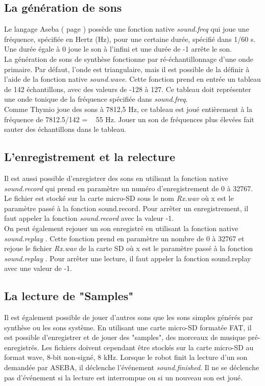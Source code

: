 \documentclass[a4paper, 12pt]{report}
\begin{document}
\subsection{La génération de sons}
Le langage Aseba ( page \pageref{aseba} ) possède une fonction native \textit{sound.freq} qui joue une fréquence, spécifiée en Hertz (Hz), pour une certaine durée, spécifié dans 1/60 s. Une durée égale à 0 joue le son à l'infini et une durée de -1 arrête le son.\\
La génération de sons de synthèse fonctionne par ré-échantillonnage d'une onde primaire. Par défaut, l'onde est triangulaire, mais il est possible de la	définir à l'aide de la fonction native \textit{sound.wave}. Cette fonction prend en entrée un tableau de 142 échantillons, avec des valeurs de -128 à 127. Ce tableau doit représenter une onde tonique de la fréquence spécifiée dans \textit{sound.freq}.\\
 Comme Thymio joue des sons à 7812,5 Hz, ce tableau est joué entièrement à la fréquence de 7812.5/142 = ~ 55 Hz. Jouer un son de fréquences plus élevées fait sauter des échantillons dans le tableau.

\subsection{L'enregistrement et la relecture}
Il est aussi possible d'enregistrer des sons en utilisant la fonction native \textit{sound.record} qui prend en paramètre un numéro d'enregistrement de 0 à 32767. Le fichier est stocké sur la carte micro-SD sous le nom \textit{Rx.wav} où x est le paramètre passé à la fonction sound.record. Pour arrêter un enregistrement, il faut appeler la fonction  \textit{sound.record} avec la valeur -1.\\
On peut également rejouer un son enregistré en utilisant la fonction native \textit{sound.replay }. Cette fonction prend en paramètre un nombre de 0 à 32767 et rejoue le fichier  \textit{Rx.wav} de la carte SD où x est le paramètre passé à la fonction \textit{sound.replay }. Pour arrêter une lecture, il faut appeler la fonction sound.replay avec une valeur de -1.

\subsection{La lecture de "Samples"}
Il est également possible de jouer d'autres sons que les sons simples générés par synthèse ou les sons système. En utilisant une carte micro-SD formatée FAT, il est possible d'enregistrer et de jouer des "samples", des morceaux de musique pré-enregistrés. Les fichiers doivent cependant être stockés sur la carte micro-SD au format wave, 8-bit non-signé, 8 kHz. Lorsque le robot finit la lecture d'un son demandée par ASEBA, il déclenche l'événement \textit{sound.finished}. Il ne se déclenche pas d'événement si la lecture est interrompue ou si un nouveau son est joué.\\
\end{document}
